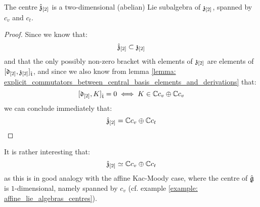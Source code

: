         \begin{proposition} \label{prop: centres_of_yangian_extended_toroidal_lie_algebras}
            The centre $\hat{\mathfrak{z}}_{[2]}$ is a two-dimensional (abelian) Lie subalgebra of $\mathfrak{z}_{[2]}$, spanned by $c_v$ and $c_t$. 
        \end{proposition}
            \begin{proof}
                Since we know that:
                    $$\hat{\mathfrak{z}}_{[2]} \subset \mathfrak{z}_{[2]}$$
                and that the only possibly non-zero bracket with elements of $\mathfrak{z}_{[2]}$ are elements of $[\mathfrak{d}_{[2]}, \mathfrak{z}_{[2]}]_{\hat{\mathfrak{t}}}$, and since we also know from lemma \ref{lemma: explicit_commutators_between_central_basis_elements_and_derivations} that:
                    $$[\mathfrak{d}_{[2]}, K]_{\hat{\mathfrak{t}}} = 0 \iff K \in \mathbb{C} c_v \oplus \mathbb{C} c_v$$
                we can conclude immediately that:
                    $$\hat{\mathfrak{z}}_{[2]} = \mathbb{C} c_v \oplus \mathbb{C} c_t$$
            \end{proof}
        \begin{remark}
            It is rather interesting that:
                $$\hat{\mathfrak{z}}_{[2]} \simeq \mathbb{C} c_v \oplus \mathbb{C} c_t$$
            as this is in good analogy with the affine Kac-Moody case, where the centre of $\hat{\mathfrak{g}}$ is $1$-dimensional, namely spanned by $c_v$ (cf. example \ref{example: affine_lie_algebras_centres}).
        \end{remark}